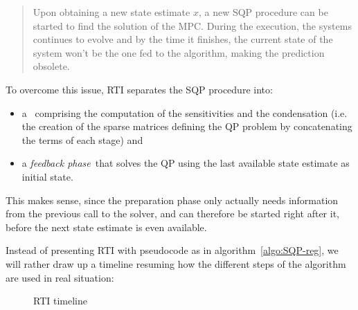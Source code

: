 \documentclass[12pt]{article}
\begin{document}
\begin{quote}
	Upon obtaining a new state estimate $x$, a new SQP procedure can be started to find the solution of the MPC.
	During the execution, the systems continues to evolve and by the time it finishes, the current state of the system won't be the one fed to the algorithm, making the prediction obsolete.
\end{quote}

To overcome this issue, RTI separates the SQP procedure into:
\begin{itemize}[label=\textbullet]
	\item a \color{black}~comprising the computation of the sensitivities and the condensation (i.e. the creation of the sparse matrices defining the QP problem by concatenating the terms of each stage) and

	\item a \color{blue}\textit{feedback phase}\color{black}~that solves the QP using the last available state estimate as initial state.
\end{itemize}

This makes sense, since the preparation phase only actually needs information from the previous call to the solver, and can therefore be started right after it, before the next state estimate is even available.

Instead of presenting RTI with pseudocode as in algorithm~\ref{algo:SQP-reg}, we will rather draw up a timeline resuming how the different steps of the algorithm are used in real situation:

\vspace{12pt}

\begin{figure}[H]
	\startchronology[startyear=-3,stopyear=5,startdate=false,dates=false,color=black,width=\textwidth, arrow=true]
	\stopchronology
	\caption{RTI timeline}
	\label{fig:RTI-timeline}
\end{figure}
\end{document}
